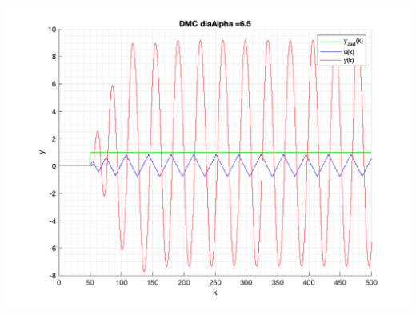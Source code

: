 \documentclass[a4paper, 11pt]{article}
\begin{document}
\begin{enumerate}
 \includegraphics[width=\linewidth]{./ModelsDodatkowe_Alpha/P4_DMC_Alpha_6_5_png.png} 

\end{enumerate}
\end{document}
